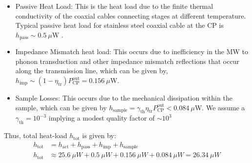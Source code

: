 \begin{itemize}
This gives the following:
\begin{equation}
    P^{\text{out}}_{\text{CP}} = 10^{-(\alpha_{\text{th}}(L_{1}+L_{2}+L_{3}+L_{4})+4)}P_{\text{source}}
\end{equation}
We take the following values: $\alpha_{\text{th}}=2$ dB/m \cite{krinner2019engineering}, $L_{j}=\{200, 290, 250, 170, 140\}$ mm \cite{krinner2019engineering}, which gives $ P^{\text{out}}_{\text{CP}}\approx6.58\times 10^{-5} P_{\text{source}}$. Thus, in order to have $P^{\text{out}}_{\text{CP}}\approx 0.24~\mu$W, we need $P_{\text{source}}\approx 3.65$ mW. Thus, the active heat load ($h_{\text{act}}$) at the CP stage is given by:
\begin{subequations}
    \begin{align}
      h_{\text{act}} &= P^{\text{out}}_{1K} - P^{\text{out}}_{CP} = 10^{-(\alpha_{\text{th}}(L_{1}+L_{2}+L_{3})+2)}P_{\text{source}} - P^{\text{out}}_{CP}\\
      h_{\text{act}} &\approx 25.6~\mu W
    \end{align}
\end{subequations}
\item Passive Heat Load: This is the heat load due to the finite thermal conductivity of the coaxial cables connecting stages at different temperature. Typical passive heat load for stainless steel coaxial cable at the CP is $h_{\text{pass}}\sim 0.5~\mu$W \cite{krinner2019engineering}.
\item Impedance Mismatch heat load: This occurs due to inefficiency in the MW to phonon transduction and other impedance mismatch reflections that occur along the transmission line, which can be given by, $h_{\text{imp}}\sim (1-\eta_{\text{tr}})P^{\text{out}}_{\text{CP}} = 0.156~\mu$W. 

\item Sample Losses: This occurs due to the mechanical dissipation within the sample, which can be given by $h_{\text{sample}}=\gamma_{\text{th}}\eta_{\text{tr}}P_{\text{CP}}^{\text{out}} < 0.084~\mu$W. We assume a $\gamma_{\text{th}}=10^{-3}$ implying a modest quality factor of $\sim10^{3}$ 
\end{itemize}
Thus, total heat-load $h_{\text{tot}}$ is given by:
\begin{subequations}
    \begin{align}
      h_{\text{tot}} &= h_{\text{act}} + h_{\text{pass}} + h_{\text{imp}} + h_{\text{sample}}\\
  h_{\text{tot}} &\approx 25.6~\mu W + 0.5~\mu W + 0.156~\mu W + 0.084~\mu W = 26.34~\mu W
    \end{align}
\end{subequations}
